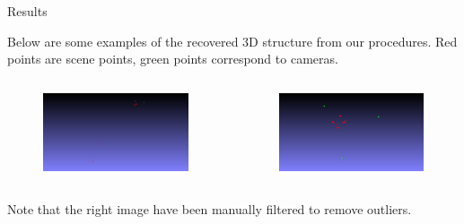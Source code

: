 \documentclass[aspectratio=43]{beamer}
\begin{document}
\begin{frame}{Results}

  Below are some examples of the recovered 3D structure from our procedures. Red
  points are scene points, green points correspond to cameras.

  \begin{columns}
    \begin{column}{0.5\columnwidth}
      \begin{figure}
        \centering
        \includegraphics[width=1.0\textwidth]{img/sfm_all}
      \end{figure}
    \end{column}
    \begin{column}{0.5\columnwidth}
      \begin{figure}
        \centering
        \includegraphics[width=1.0\textwidth]{img/sfm_filtered}
      \end{figure}
    \end{column}
  \end{columns}

  \vspace{0.2cm}
  Note that the right image have been manually filtered to remove outliers.

\end{frame}
\end{document}
